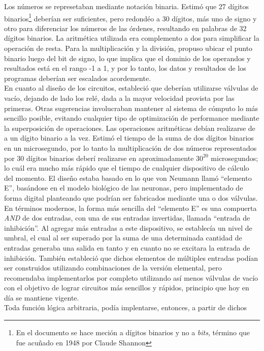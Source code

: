 Los números se represetaban mediante notación binaria. Estimó que 27 dígitos
binarios\footnote{En el documento se hace meción a dígitos binarios y no a
\emph{bits}, término que fue acuñado en 1948 por Claude Shannon} deberían ser
suficientes, pero redondéo a 30 dígitos, más uno de signo y otro para
diferenciar los números de las órdenes, resultando en palabras de 32 dígitos
binarios. La aritmética utilizada era complemento a dos para simplificar la
operación de resta. Para la multiplicación y la división, propuso ubicar el
punto binario luego del bit de signo, lo que implica que el dominio de los
operandos y resultados está en el rango -1 a 1, y por lo tanto, los datos y
resultados de los programas deberían ser escalados acordemente.\\
En cuanto al diseño de los circuitos, estableció que deberían utilizarse
válvulas de vacío, dejando de lado los relé, dada a la mayor velocidad provista
por las primeras. Otras sugerencias involucraban mantener al sistema de cómputo
lo más sencillo posible, evitando cualquier tipo de optimización de performance
mediante la superposición de operaciones. Las operaciones aritméticas debían
realizarse de a un dígito binario a la vez. Estimó el tiempo de la suma de dos
dígitos binarios en un microsegundo, por lo tanto la multiplicación de dos
números representados por 30 dígitos binarios deberí realizarse en
aproximadamente $30^{20}$ microsegundos; lo cuál era mucho más rápido que el
tiempo de cualquier dispositivo de cálculo del momento. El diseño estaba basado
en lo que von Neumann llamó ``elemento E'', basándose en el modelo biológico de
las neuronas, pero implementado de forma digital planteando que podrían ser
fabricados mediante una o dos válvulas. En términos modernos, la forma más
sencilla del ``elemento E'' es una compuerta \emph{AND} de dos entradas, con una
de sus entradas invertidas, llamada ``entrada de inhibición''. Al agregar más
entradas a este dispositivo, se establecía un nivel de umbral, el cual al ser
superado por la suma de una determinada cantidad de entradas generaba una salida
en tanto y en cuanto no se excitara la entrada de inhibición. También estableció
que dichos elementos de múltiples entradas podían ser construidos utilizando
combinaciones de la versión elemental, pero recomendaba implementarlos por
completo utilizando así menos válvulas de vacío con el objetivo de lograr
circuitos más sencillos y rápidos, principio que hoy en día se mantiene
vigente.\\
Toda función lógica arbitraria, podía implentarse, entonces, a partir de dichos
